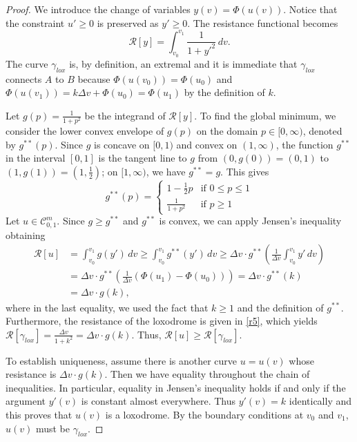 \documentclass[a4paper,12pt]{amsart}
\theoremstyle{definition}
\def\R{\mathcal{ R}}
\begin{document}
\begin{proof}
We introduce the change of variables $y(v) = \Phi(u(v))$. Notice that the constraint $u' \ge 0$ is preserved as $y' \ge 0$. The resistance functional becomes 
\begin{equation}
\mathcal{R}[y] = \int_{v_0}^{v_1} \frac{1}{1 + y'^2}\, dv.
\end{equation}
The curve $\gamma_{lox}$ is, by definition, an extremal and it is immediate that $\gamma_{lox}$ connects $A$ to $B$ because $\Phi(u(v_0))=\Phi(u_0)$ and $\Phi(u(v_1))=k\Delta v+\Phi(u_0)=\Phi(u_1)$ by the definition of $k$. 

Let $g(p) = \frac{1}{1+p^2}$ be the integrand of $\mathcal{R}[y]$. To find the global minimum, we consider the lower convex envelope of $g(p)$ on the domain $p \in [0, \infty)$, denoted by $g^{**}(p)$. Since $g$ is concave on $[0,1)$ and convex on $(1,\infty)$, the function $g^{**}$ in the interval $[0,1]$ is the tangent line to $g$ from $(0, g(0)) = (0, 1)$ to $(1,g(1))=(1,\frac12)$; on $[1,\infty)$, we have $g^{**}=g$. This gives
\begin{equation}
g^{**}(p) = \begin{cases} 
1 - \frac{1}{2}p & \text{if } 0 \le p \le 1 \\
\frac{1}{1+p^2} & \text{if } p \geq 1 
\end{cases}
\end{equation}
Let $u\in \mathcal{C}_{0,1}^m$. Since $g\geq g^{**} $ and $g^{**}$ is convex, we can apply Jensen's inequality obtaining
\begin{equation}
 \begin{split}
\R[u]&= \int_{v_0}^{v_1} g(y')\, dv \ge \int_{v_0}^{v_1} g^{**}(y')\, dv \ge \Delta v\cdot g^{**} \left( \frac{1}{\Delta v} \int_{v_0}^{v_1} y'\, dv \right) \\
&= \Delta v\cdot g^{**} \left( \frac{1}{\Delta v} (\Phi(u_1)-\Phi(u_0)) \right)= \Delta v\cdot g^{**}(k)\\
&=\Delta v\cdot g(k),
\end{split}
\end{equation}
where in the last equality, we used the fact that $k\geq 1$ and the definition of $g^{**}$. Furthermore, the resistance of the loxodrome is given in \eqref{r5}, which yields $\R[\gamma_{lox}]=\frac{\Delta v}{1+k^2}=\Delta v\cdot g(k)$. Thus, $\R[u]\geq \R[\gamma_{lox}]$. 

To establish uniqueness, assume there is another curve $u=u(v)$ whose resistance is $\Delta v\cdot g(k)$. Then we have equality throughout the chain of inequalities. In particular, equality in Jensen's inequality holds if and only if the argument $y'(v)$ is constant almost everywhere. Thus $y'(v) = k$ identically and this proves that $u(v)$ is a loxodrome. By the boundary conditions at $v_0$ and $v_1$, $u(v)$ must be $\gamma_{lox}$. 
\end{proof}
 
\end{document}
